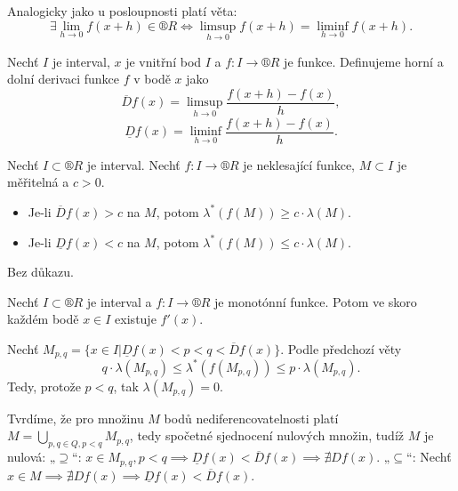 \documentclass[12pt]{article}					%
\begin{document}
	\begin{poznamka}
		Analogicky jako u posloupnosti platí věta:
		$$ \exists \lim_{h \rightarrow 0} f(x + h) \in ®R \Leftrightarrow \limsup_{h \rightarrow 0} f(x + h) = \liminf_{h \rightarrow 0} f(x + h). $$
	\end{poznamka}

	\begin{definice}
		Nechť $I$ je interval, $x$ je vnitřní bod $I$ a $f: I \rightarrow ®R$ je funkce. Definujeme horní a dolní derivaci funkce $f$ v bodě $x$ jako
		$$ \overline{D} f(x) = \limsup_{h \rightarrow 0} \frac{f(x + h) - f(x)}{h}, $$
		$$ \underline{D} f(x) = \liminf_{h \rightarrow 0} \frac{f(x + h) - f(x)}{h}. $$
	\end{definice}

	\begin{veta}
		Nechť $I \subset ®R$ je interval. Nechť $f: I \rightarrow ®R$ je neklesající funkce, $M \subset I$ je měřitelná a $c > 0$.

		\begin{itemize}
			\item Je-li $\overline{D} f(x) > c$ na $M$, potom $\lambda^*(f(M)) ≥ c·\lambda(M)$.
			\item Je-li $\underline{D} f(x) < c$ na $M$, potom $\lambda^*(f(M)) ≤ c·\lambda(M)$.
		\end{itemize}

		\begin{dukazin}
			Bez důkazu.
		\end{dukazin}
	\end{veta}

	\begin{veta}
		Nechť $I \subset ®R$ je interval a $f: I \rightarrow ®R$ je monotónní funkce. Potom ve skoro každém bodě $x \in I$ existuje $f'(x)$.

		\begin{dukazin}
			Nechť $M_{p, q} = \{x \in I | \underline{D}f(x) < p < q < \overline{D}f(x)\}$. Podle předchozí věty
			$$ q·\lambda(M_{p, q}) ≤ \lambda^*(f(M_{p, q})) ≤ p·\lambda(M_{p, q}). $$
			Tedy, protože $p < q$, tak $\lambda(M_{p, q}) = 0$.

			Tvrdíme, že pro množinu $M$ bodů nediferencovatelnosti platí $M = \bigcup_{p, q \in Q, p < q} M_{p, q}$, tedy spočetné sjednocení nulových množin, tudíž $M$ je nulová: „$\supseteq$“: $x \in M_{p, q}, p < q \implies \underline{D}f(x) < \overline{D}f(x) \implies \nexists D f(x)$. „$\subseteq$“: Nechť $x \in M \implies \nexists D f(x) \implies \underline{D} f(x) < \overline{D}f(x)$.
		\end{dukazin}
	\end{veta}
\end{document}
